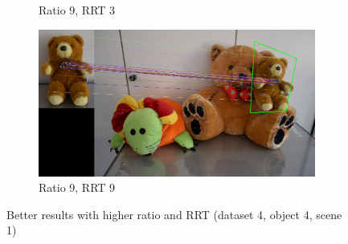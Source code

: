 \documentclass[a4paper]{article}
\begin{document}
\begin{figure}[h!]
\begin{subfigure}[b]{0.45\textwidth}
        \caption{Ratio 9, RRT 3}
        \label{fig:data430931}
    \end{subfigure}
    \quad
    \begin{subfigure}[b]{0.45\textwidth}
        \includegraphics[width=\textwidth]{Data4_DetRANMatches_3_0_ratio9_RRT9_NF1000.png}
        \caption{Ratio 9, RRT 9}
        \label{fig:data430991}
    \end{subfigure}
    \caption{Better results with higher ratio and RRT (dataset 4, object 4, scene 1)}
    \label{fig:data4rr}
\end{figure}
\end{document}
